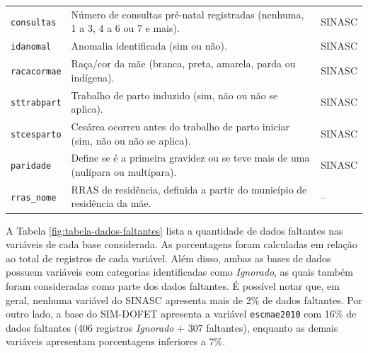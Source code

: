 \begin{table}[H]
\begin{tabular}{@{} L{3cm} L{7cm} L{3cm} @{}}
        \texttt{consultas} &
        Número de consultas pré-natal registradas (nenhuma, 1 a 3, 4 a 6 ou 7 e mais). &
        SINASC \\
        
        \texttt{idanomal} &
        Anomalia identificada (sim ou não). &
        SINASC \\
        
        \texttt{racacormae} &
        Raça/cor da mãe (branca, preta, amarela, parda ou indígena). &
        SINASC \\
        
        \texttt{sttrabpart} &
        Trabalho de parto induzido (sim, não ou não se aplica). &
        SINASC \\
        
        \texttt{stcesparto} &
        Cesárea ocorreu antes do trabalho de parto iniciar (sim, não ou não se
        aplica). &
        SINASC \\
        
        \texttt{paridade} &
        Define se é a primeira gravidez ou se teve mais de uma (nulípara ou
        multípara). &
        SINASC \\
        
        \texttt{rras\_nome} &
        RRAS de residência, definida a partir do município de residência da mãe. &
        -- \\
        
        \bottomrule
    \end{tabular}
\label{fig:tabela-variaveis}
\end{table}

A Tabela \ref{fig:tabela-dados-faltantes} lista a quantidade de dados faltantes
nas variáveis de cada base considerada. As porcentagens foram calculadas em relação 
ao total de registros de cada variável. Além disso, ambas as bases de dados possuem 
variáveis com categorias identificadas como \emph{Ignorado}, as quais também foram 
consideradas como parte dos dados faltantes. É possível notar que, em geral, nenhuma 
variável do SINASC apresenta mais de 2\% de dados faltantes. Por outro lado, a base 
do SIM-DOFET apresenta a variável \texttt{escmae2010} com 16\% de dados faltantes 
(406 registros \emph{Ignorado} + 307 faltantes), enquanto as demais variáveis 
apresentam porcentagens inferiores a 7\%.

